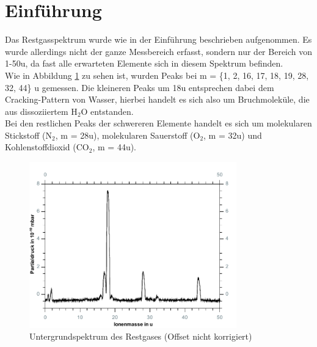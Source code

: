 \section{Einführung}

Das Restgasspektrum wurde wie in der Einführung beschrieben aufgenommen. Es wurde allerdings nicht der ganze Messbereich erfasst, sondern nur der Bereich von 1-50\;u, da fast alle erwarteten Elemente sich in diesem Spektrum befinden.\\
Wie in Abbildung \ref{fig:untergrund_1} zu sehen ist, wurden Peaks bei m = \{1, 2, 16, 17, 18, 19, 28, 32, 44\} u gemessen. Die kleineren Peaks um 18\;u entsprechen dabei dem Cracking-Pattern von Wasser, hierbei handelt es sich also um Bruchmoleküle, die aus dissoziiertem
H$_2$O entstanden.\\
Bei den restlichen Peaks der schwereren Elemente handelt es sich um molekularen Stickstoff (N$_2$, m = 28\;u), molekularen Sauerstoff (O$_2$, m = 32\;u) und Kohlenstoffdioxid (CO$_2$, m = 44\;u).\\

\begin{figure}[h]
	\centering\includegraphics[width=0.8\textwidth]{fig/untergrund_1}
	\caption{Untergrundspektrum des Restgases (Offset nicht korrigiert)}
	\label{fig:untergrund_1}
\end{figure}

